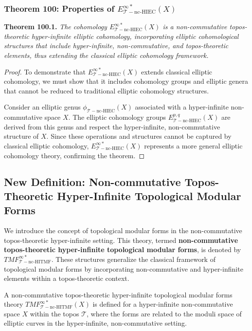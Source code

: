 \documentclass{article}
\begin{document}
\subsubsection{Theorem 100: Properties of \(E_{\mathcal{T}-\text{nc-HIEC}}^{\infty *}(X)\)}
\textbf{Theorem 100.1.} \textit{The cohomology \(E_{\mathcal{T}-\text{nc-HIEC}}^{\infty *}(X)\) is a non-commutative topos-theoretic hyper-infinite elliptic cohomology, incorporating elliptic cohomological structures that include hyper-infinite, non-commutative, and topos-theoretic elements, thus extending the classical elliptic cohomology framework.}

\begin{proof}
To demonstrate that \(E_{\mathcal{T}-\text{nc-HIEC}}^{\infty *}(X)\) extends classical elliptic cohomology, we must show that it includes cohomology groups and elliptic genera that cannot be reduced to traditional elliptic cohomology structures.

Consider an elliptic genus \(\phi_{\mathcal{T}-\text{nc-HIEC}}(X)\) associated with a hyper-infinite non-commutative space \(X\). The elliptic cohomology groups \(E_{\mathcal{T}-\text{nc-HIEC}}^{p,q}(X)\) are derived from this genus and respect the hyper-infinite, non-commutative structure of \(X\). Since these operations and structures cannot be captured by classical elliptic cohomology, \(E_{\mathcal{T}-\text{nc-HIEC}}^{\infty *}(X)\) represents a more general elliptic cohomology theory, confirming the theorem.
\end{proof}

\subsection{New Definition: Non-commutative Topos-Theoretic Hyper-Infinite Topological Modular Forms}
We introduce the concept of topological modular forms in the non-commutative topos-theoretic hyper-infinite setting. This theory, termed \textbf{non-commutative topos-theoretic hyper-infinite topological modular forms}, is denoted by \(TMF_{\mathcal{T}-\text{nc-HITMF}}^{\infty *}\). These structures generalize the classical framework of topological modular forms by incorporating non-commutative and hyper-infinite elements within a topos-theoretic context.

A non-commutative topos-theoretic hyper-infinite topological modular forms theory \(TMF_{\mathcal{T}-\text{nc-HITMF}}^{\infty *}(X)\) is defined for a hyper-infinite non-commutative space \(X\) within the topos \(\mathcal{T}\), where the forms are related to the moduli space of elliptic curves in the hyper-infinite, non-commutative setting.
\end{document}
